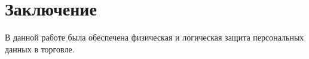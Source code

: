 \section*{Заключение}

В данной работе была обеспечена физическая и логическая защита персональных данных в торговле.